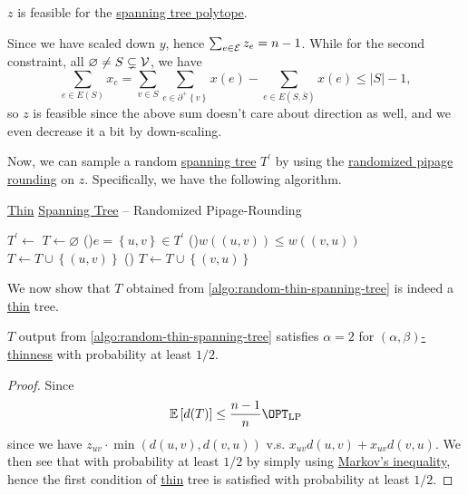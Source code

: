 \begin{remark}
	\(z\) is feasible for the \hyperref[eq:spanning-tree-polytope]{spanning tree polytope}.
\end{remark}
\begin{explanation}
	Since we have scaled down \(y\), hence \(\sum_{e\in \mathcal{\MakeUppercase{e}} } z_e = n-1\). While for the second constraint, all \(\varnothing \neq S \subsetneq \mathcal{\MakeUppercase{v}} \), we have
	\[
		\sum_{e\in E(S)} x_e = \sum_{v\in S} \sum_{e\in \partial ^+ \left\{ v \right\} } x(e) - \sum_{e\in E(S, \overline{S} )} x(e) \leq \left\vert S \right\vert - 1,
	\]
	so \(z\) is feasible since the above sum doesn't care about direction as well, and we even decrease it a bit by down-scaling.
\end{explanation}

Now, we can sample a random \hyperref[def:spanning-tree]{spanning tree} \(T^\prime \) by using the \hyperref[algo:min-spanning-tree-randomized-pipage-rounding]{randomized pipage rounding} on \(z\). Specifically, we have the following algorithm.

\begin{algorithm}[H]\label{algo:random-thin-spanning-tree}
	\DontPrintSemicolon
	\caption{\hyperref[def:thin]{Thin} \hyperref[def:spanning-tree]{Spanning Tree} -- Randomized Pipage-Rounding}
	\BlankLine
	\(T^\prime \gets\)\;
	\(T\gets \varnothing \)\;
	\For(){\(e=\left\{ u, v \right\} \in T^\prime \)}{
		\uIf(){\(w((u, v)) \leq w((v, u))\)}{
			\(T\gets T \cup \left\{ (u, v) \right\} \)\;
		}
		\Else(){
			\(T\gets T \cup \left\{ (v, u) \right\} \)\;
		}
	}
	\;
\end{algorithm}

We now show that \(T\) obtained from \autoref{algo:random-thin-spanning-tree} is indeed a \hyperref[def:thin]{thin} tree.

\begin{lemma}\label{lma:lec12-1}
	\(T\) output from \autoref{algo:random-thin-spanning-tree} satisfies \(\alpha =2\) for \hyperref[def:thin]{\((\alpha , \beta )\)-thinness} with probability at least \(1/2\).
\end{lemma}
\begin{proof}
	Since
	\[
		\mathbb{E}\left[d(T) \right] \leq \frac{n-1}{n}\OPT_{\mathrm{LP} }
	\]
	since we have \(z_{uv}\cdot \min (d(u, v), d(v, u))\) v.s. \(x_{uv} d(u, v) + x_{uv} d(v, u)\). We then see that with probability at least \(1 / 2\) by simply using \href{https://en.wikipedia.org/wiki/Markov%27s_inequality}{Markov's inequality}, hence the first condition of \hyperref[def:thin]{thin} tree is satisfied with probability at least \(1 / 2\).
\end{proof}

